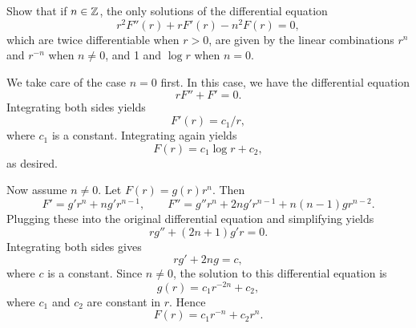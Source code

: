 \begin{exrc}[11]
    Show that if \(n \in \mathbb{Z}\),
    the only solutions of the differential equation
    \begin{equation*}
        r^2 F''(r) + r F'(r) - n^2 F(r) = 0,
    \end{equation*}
    which are twice differentiable when \(r > 0\),
    are given by the linear combinations \(r^n\) and \(r^{-n}\) when \(n \neq 0\),
    and 1 and \(\log r\) when \(n = 0\).

\begin{soln}
    We take care of the case \(n = 0\) first.
    In this case, we have the differential equation
    \begin{equation*}
        rF'' + F' = 0.
    \end{equation*}
    Integrating both sides yields
    \begin{equation*}
        F'(r) = c_1 / r,
    \end{equation*}
    where \(c_1\) is a constant.
    Integrating again yields
    \begin{equation*}
        F(r) = c_1 \log r + c_2,
    \end{equation*}
    as desired.

    Now assume \(n \neq 0\).
    Let \(F(r) = g(r) r^n\).  Then
    \begin{equation*}
        F' = g' r^n + n g' r^{n - 1}, \quad \quad
        F'' = g'' r^n + 2n g' r^{n - 1} + n(n - 1)g r^{n - 2}.
    \end{equation*}
    Plugging these into the original differential equation and simplifying yields
    \begin{equation*}
        r g'' + (2n + 1) g' r = 0.
    \end{equation*}
    Integrating both sides gives
    \begin{equation*}
        rg' + 2n g = c,
    \end{equation*}
    where \(c\) is a constant.
    Since \(n \neq 0\), the solution to this differential equation is
    \begin{equation*}
        g(r) = c_1 r^{-2n} + c_2,
    \end{equation*}
    where \(c_1\) and \(c_2\) are constant in \(r\).
    Hence
    \begin{equation*}
        F(r) = c_1 r^{-n} + c_2 r^n.
    \end{equation*}

\end{soln}
\end{exrc}
